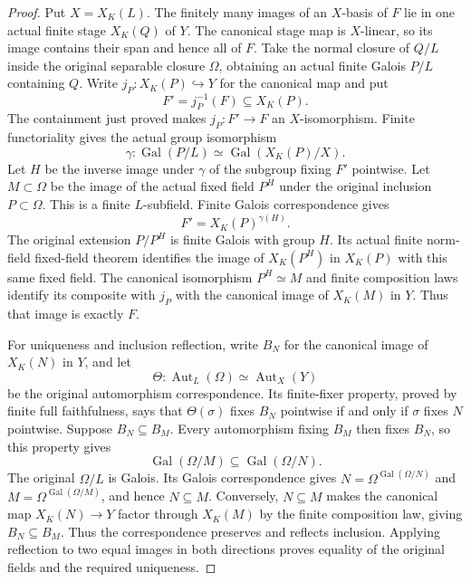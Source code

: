\begin{proof}
Put $X=X_K(L)$. The finitely many images of an $X$-basis of $F$
lie in one actual finite stage $X_K(Q)$ of $Y$. The canonical
stage map is $X$-linear, so its image contains their span and hence
all of $F$. Take the normal closure of $Q/L$ inside the original
separable closure $\Omega$, obtaining an actual finite Galois
$P/L$ containing $Q$. Write $j_P:X_K(P)\hookrightarrow Y$ for
the canonical map and put
\[
 F'=j_P^{-1}(F)\subseteq X_K(P).
\]
The containment just proved makes $j_P:F'\to F$ an $X$-isomorphism.
Finite functoriality gives the actual group isomorphism
\[
 \gamma:\operatorname{Gal}(P/L)\simeq
 \operatorname{Gal}(X_K(P)/X).
\]
Let $H$ be the inverse image under $\gamma$ of the subgroup fixing
$F'$ pointwise. Let $M\subset\Omega$ be the image of the actual
fixed field $P^H$ under the original inclusion $P\subset\Omega$.
This is a finite $L$-subfield. Finite Galois correspondence gives
\[
 F'=X_K(P)^{\gamma(H)}.
\]
The original extension $P/P^H$ is finite Galois with group $H$.
Its actual finite norm-field fixed-field theorem identifies the
image of $X_K(P^H)$ in $X_K(P)$ with this same fixed field. The
canonical isomorphism $P^H\simeq M$ and finite composition laws
identify its composite with $j_P$ with the canonical image of
$X_K(M)$ in $Y$. Thus that image is exactly $F$.

For uniqueness and inclusion reflection, write $B_N$ for the canonical
image of $X_K(N)$ in $Y$, and let
\[
 \Theta:\operatorname{Aut}_L(\Omega)\simeq
 \operatorname{Aut}_X(Y)
\]
be the original automorphism correspondence. Its finite-fixer property,
proved by finite full faithfulness, says that $\Theta(\sigma)$ fixes
$B_N$ pointwise if and only if $\sigma$ fixes $N$ pointwise.
Suppose $B_N\subseteq B_M$. Every automorphism fixing $B_M$
then fixes $B_N$, so this property gives
\[
 \operatorname{Gal}(\Omega/M)\subseteq
 \operatorname{Gal}(\Omega/N).
\]
The original $\Omega/L$ is Galois. Its Galois correspondence gives
$N=\Omega^{\operatorname{Gal}(\Omega/N)}$ and
$M=\Omega^{\operatorname{Gal}(\Omega/M)}$, and hence $N\subseteq M$.
Conversely, $N\subseteq M$ makes the canonical map $X_K(N)\to Y$
factor through $X_K(M)$ by the finite composition law, giving
$B_N\subseteq B_M$. Thus the correspondence preserves and reflects
inclusion. Applying reflection to two equal images in both directions
proves equality of the original fields and the required uniqueness.
\end{proof}

